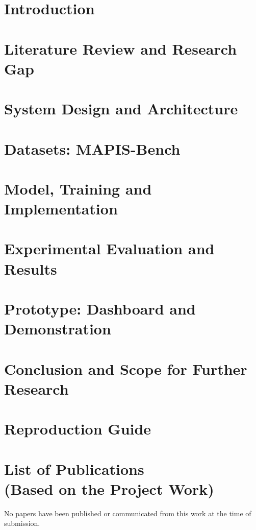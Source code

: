 \documentclass[a4paper, 12pt]{report}
\theoremstyle{definition}
\begin{document}
\clearpage
{}
\setcounter{page}{1}
\chapter{Introduction}

\chapter{Literature Review and Research Gap}

\chapter{System Design and Architecture}

\chapter{Datasets: MAPIS-Bench}

\chapter{Model, Training and Implementation}

\chapter{Experimental Evaluation and Results}

\chapter{Prototype: Dashboard and Demonstration}

\chapter{Conclusion and Scope for Further Research}

\appendix
\chapter{Reproduction Guide}


\newpage
\renewcommand{\bibname}{References}



\chapter*{List of Publications \\ \large(Based on the Project Work)}
No papers have been published or communicated from this work at the time of submission.
\end{document}
